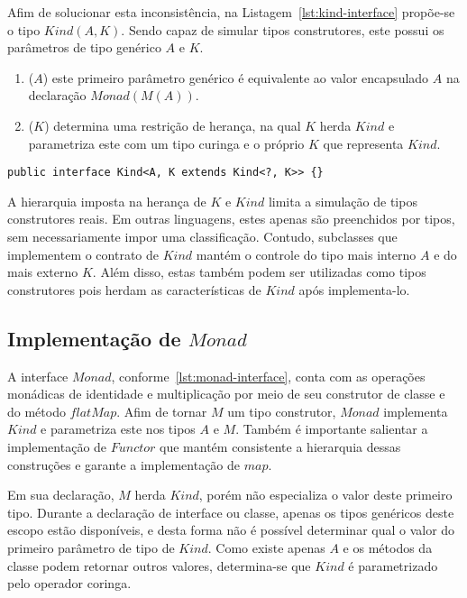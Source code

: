\documentclass[10pt, conference]{IEEEtran}
\begin{document}
Afim de solucionar esta inconsistência, na Listagem~\ref{lst:kind-interface} propõe-se o tipo $Kind(A, K)$. Sendo capaz de simular tipos construtores, este possui os parâmetros de tipo genérico $A$ e $K$.

\begin{enumerate}[label=(\alph*), leftmargin=3em, topsep = 0pt, itemsep = 1ex, partopsep = 1ex, parsep = 1ex]
	\item ($A$) este primeiro parâmetro genérico é equivalente ao valor encapsulado $A$ na declaração ${Monad(M(A))}$.
	\item ($K$) determina uma restrição de herança, na qual $K$ herda $Kind$ e parametriza este com um tipo curinga e o próprio $K$ que representa $Kind$.
\end{enumerate}

\begin{lstlisting}[caption={Interface Kind}, label={lst:kind-interface}]
public interface Kind<A, K extends Kind<?, K>> {}
\end{lstlisting}

A hierarquia imposta na herança de $K$ e $Kind$ limita a simulação de tipos construtores reais. Em outras linguagens, estes apenas são preenchidos por tipos, sem necessariamente impor uma classificação. Contudo, subclasses que implementem o contrato de $Kind$ mantém o controle do tipo mais interno $A$ e do mais externo $K$. Além disso, estas também podem ser utilizadas como tipos construtores pois herdam as características de $Kind$ após implementa-lo.

\subsection{Implementação de $Monad$}

A interface $Monad$, conforme~\ref{lst:monad-interface}, conta com as operações monádicas de identidade e multiplicação por meio de seu construtor de classe e do método $flatMap$. Afim de tornar $M$ um tipo construtor,  $Monad$ implementa $Kind$ e parametriza este nos tipos $A$ e $M$. Também é importante salientar a implementação de $Functor$ que mantém consistente a hierarquia dessas construções e garante a implementação de $map$.

Em sua declaração, $M$ herda $Kind$, porém não especializa o valor deste primeiro tipo. Durante a declaração de interface ou classe, apenas os tipos genéricos deste escopo estão disponíveis, e desta forma não é possível determinar qual o valor do primeiro parâmetro de tipo de $Kind$. Como existe apenas $A$ e os métodos da classe podem retornar outros valores, determina-se que $Kind$ é parametrizado pelo operador coringa.
\end{document}
